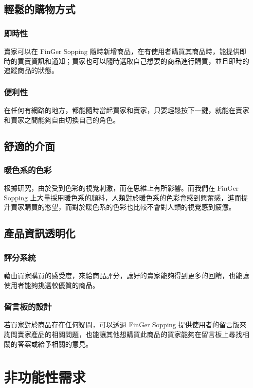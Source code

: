 \documentclass{scrreprt}
\begin{document}
\begin{CJK}{UTF8}{bkai}
\section{輕鬆的購物方式}

\subsection{即時性}
\qquad 賣家可以在 FinGer Sopping 隨時新增商品，在有使用者購買其商品時，能提供即時的買賣資訊和通知；買家也可以隨時選取自己想要的商品進行購買，並且即時的追蹤商品的狀態。

\subsection{便利性}
\qquad 在任何有網路的地方，都能隨時當起買家和賣家，只要輕鬆按下一鍵，就能在賣家和買家之間能夠自由切換自己的角色。


\section{舒適的介面}

\subsection{暖色系的色彩}
\qquad 根據研究，由於受到色彩的視覺刺激，而在思維上有所影響。而我們在 FinGer Sopping 上大量採用暖色系的顏料，人類對於暖色系的色彩會感到興奮感，進而提升買家購買的慾望，而對於暖色系的色彩也比較不會對人類的視覺感到疲憊。

\section{產品資訊透明化}
\subsection{評分系統}
\qquad 藉由買家購買的感受度，來給商品評分，讓好的賣家能夠得到更多的回饋，也能讓使用者能夠挑選較優質的商品。

\subsection{留言板的設計}
\qquad 若買家對於商品存在任何疑問，可以透過 FinGer Sopping 提供使用者的留言版來詢問賣家產品的相關問題，也能讓其他想購買此商品的買家能夠在留言板上尋找相關的答案或給予相關的意見。

\chapter{非功能性需求}


\end{CJK}
\end{document}
